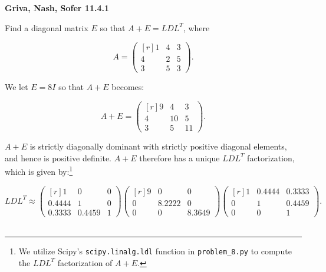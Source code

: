 \textbf{Griva, Nash, Sofer 11.4.1}

Find a diagonal matrix $E$ so that $A + E = L D L^T$, where

$$
A = \begin{pmatrix*}[r]
    1 & 4 & 3 \\
    4 & 2 & 5 \\
    3 & 5 & 3
\end{pmatrix*}.
$$

\begin{solution}
    We let $E = 8I$ so that $A + E$ becomes:

    $$
    A + E = \begin{pmatrix*}[r]
        9 & 4  & 3 \\
        4 & 10 & 5 \\
        3 & 5  & 11
    \end{pmatrix*}.
    $$

    $A + E$ is strictly diagonally dominant with strictly positive diagonal elements, and hence is positive definite. 
    $A + E$ therefore has a unique $LDL^T$ factorization, which is given by:\footnote{
        We utilize Scipy's \texttt{scipy.linalg.ldl} function in \texttt{problem\_8.py} to compute the $LDL^T$ 
        factorization of $A + E$.
    }

    $$
    LDL^T \approx \begin{pmatrix*}[r]
        1      & 0      & 0 \\
        0.4444 & 1      & 0 \\
        0.3333 & 0.4459 & 1
    \end{pmatrix*} \begin{pmatrix*}[r]
        9 & 0      & 0 \\
        0 & 8.2222 & 0 \\
        0 & 0      & 8.3649
    \end{pmatrix*} \begin{pmatrix*}[r]
        1 & 0.4444 & 0.3333 \\
        0 & 1      & 0.4459 \\
        0 & 0      & 1
    \end{pmatrix*}.
    $$
    \ \\
\end{solution}
